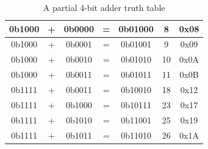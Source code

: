 \documentclass[12pt]{article}
\begin{document}
\begin{table}[h]
\begin{tabular}{ | c | c | c | c | c | c | c | }
  0b1000            & +          & 0b0000            & =          & 0b01000                                                                 & 8                                                                           & 0x08                                                                   \\ \hline
  0b1000            & +          & 0b0001            & =          & 0b01001                                                                 & 9                                                                           & 0x09                                                                   \\ \hline
  0b1000            & +          & 0b0010            & =          & 0b01010                                                                 & 10                                                                          & 0x0A                                                                   \\ \hline
  0b1000            & +          & 0b0011            & =          & 0b01011                                                                 & 11                                                                          & 0x0B                                                                   \\ \hline
  0b1111            & +          & 0b0011            & =          & 0b10010                                                                 & 18                                                                          & 0x12                                                                   \\ \hline
  0b1111            & +          & 0b1000            & =          & 0b10111                                                                 & 23                                                                          & 0x17                                                                   \\ \hline
  0b1111            & +          & 0b1010            & =          & 0b11001                                                                 & 25                                                                          & 0x19                                                                   \\ \hline
  0b1111            & +          & 0b1011            & =          & 0b11010                                                                 & 26                                                                          & 0x1A                                                                   \\ \hline
  \end{tabular}
  \caption{A partial 4-bit adder truth table}
  \label{table:2}
\end{table}
\end{document}
